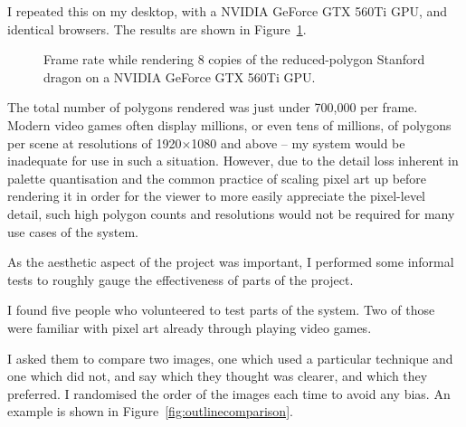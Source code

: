 \documentclass[12pt,twoside,notitlepage]{report}
\begin{document}
I repeated this on my desktop, with a NVIDIA GeForce GTX 560Ti GPU, and identical browsers. The results are shown in Figure~\ref{fig:graph3}.

\begin{figure}[h!]
\centering
{}
\caption{Frame rate while rendering 8 copies of the reduced-polygon Stanford dragon on a NVIDIA GeForce GTX 560Ti GPU.}
\label{fig:graph3}
\end{figure}

The total number of polygons rendered was just under 700,000 per frame. Modern video games often display millions, or even tens of millions, of polygons per scene at resolutions of 1920$\times$1080 and above -- my system would be inadequate for use in such a situation. However, due to the detail loss inherent in palette quantisation and the common practice of scaling pixel art up before rendering it in order for the viewer to more easily appreciate the pixel-level detail, such high polygon counts and resolutions would not be required for many use cases of the system.

As the aesthetic aspect of the project was important, I performed some informal tests to roughly gauge the effectiveness of parts of the project.

I found five people who volunteered to test parts of the system. Two of those were familiar with pixel art already through playing video games.

I asked them to compare two images, one which used a particular technique and one which did not, and say which they thought was clearer, and which they preferred. I randomised the order of the images each time to avoid any bias. An example is shown in Figure~\ref{fig:outlinecomparison}.
\end{document}
